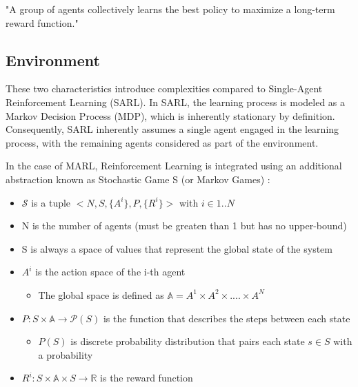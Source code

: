 \documentclass{scrartcl}
\begin{document}
"A group of agents collectively learns the best policy to maximize a long-term reward function."

\subsection{Environment}
These two characteristics introduce complexities compared to Single-Agent Reinforcement 
Learning (SARL). In SARL, the learning process is modeled as a Markov Decision Process (MDP),
 which is inherently stationary by definition. Consequently, SARL inherently assumes a single
  agent engaged in the learning process, with the remaining agents considered as part of the 
  environment.

In the case of MARL, Reinforcement Learning is integrated using an additional abstraction 
known as Stochastic Game S (or Markov Games) \cite{LITTMAN1994157}:

\begin{itemize}
  \item $\mathcal{S}$ is a tuple $<N, S, \{A^i\}, P,  \{R^i\}>$ with $i \in 1..N$
  \item N is the number of agents (must be greaten than 1 but has no upper-bound)
  \item S is always a space of values that represent the global state of the system
  \item $A^i$ is the action space of the i-th agent
  \begin{itemize}
       \item The global space is defined as $\mathbb{A} = A^1 \times A^2 \times .... \times A^N$
  \end{itemize}
  \item $P: S \times \mathbb{A} \rightarrow \mathcal{P}(S)$ is the function that describes the steps between each state
  \begin{itemize}
      \item $P(S)$ is discrete probability distribution that pairs each state $s \in S$ with a probability
  \end{itemize}
  \item $R^i: S \times \mathbb{A} \times S \rightarrow \mathbb{R}$ is the reward function
\end{itemize}
\end{document}
